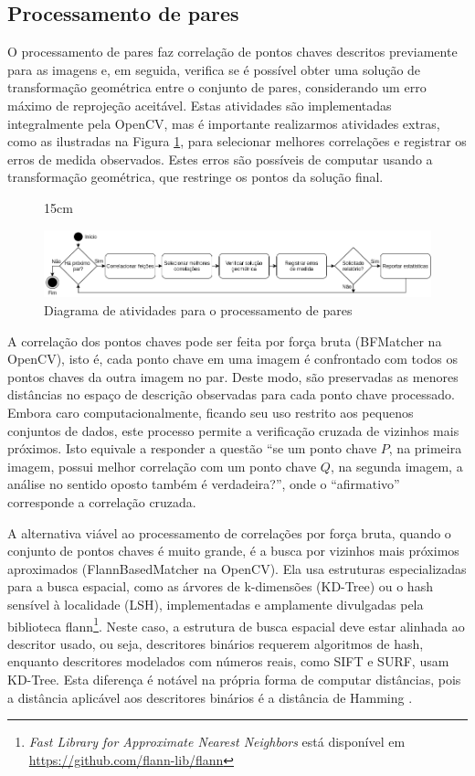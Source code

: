 \subsection{Processamento de pares}

O processamento de pares faz correlação de pontos chaves descritos previamente para as imagens e, em seguida, verifica se é possível obter uma solução de transformação geométrica entre o conjunto de pares, considerando um erro máximo de reprojeção aceitável. Estas atividades são implementadas integralmente pela OpenCV, mas é importante realizarmos atividades extras, como as ilustradas na Figura \ref{fl:pares}, para selecionar melhores correlações e registrar os erros de medida observados. Estes erros são possíveis de computar usando a transformação geométrica, que restringe os pontos da solução final.

\begin{figure}[!h]{15cm}
  \caption{Diagrama de atividades para o processamento de pares} \label{fl:pares}
  \includegraphics[width=\hsize]{figuras/fluxo_pares.png}
\end{figure}

A correlação dos pontos chaves pode ser feita por força bruta (BFMatcher na OpenCV), isto é, cada ponto chave em uma imagem é confrontado com todos os pontos chaves da outra imagem no par. Deste modo, são preservadas as menores distâncias no espaço de descrição observadas para cada ponto chave processado. Embora caro computacionalmente, ficando seu uso restrito aos pequenos conjuntos de dados, este processo permite a verificação cruzada de vizinhos mais próximos. Isto equivale a responder a questão ``se um ponto chave $P$, na primeira imagem, possui melhor correlação com um ponto chave $Q$, na segunda imagem, a análise no sentido oposto também é verdadeira?'', onde o ``afirmativo'' corresponde a correlação cruzada.

A alternativa viável ao processamento de correlações por força bruta, quando o conjunto de pontos chaves é muito grande, é a busca por vizinhos mais próximos aproximados (FlannBasedMatcher na OpenCV). Ela usa estruturas especializadas para a busca espacial, como as árvores de k-dimensões (KD-Tree) ou o hash sensível à localidade (LSH), implementadas e amplamente divulgadas pela biblioteca flann\footnote{\textit{Fast Library for Approximate Nearest Neighbors} está disponível em \url{https://github.com/flann-lib/flann}}. Neste caso, a estrutura de busca espacial deve estar alinhada ao descritor usado, ou seja, descritores binários requerem algoritmos de hash, enquanto descritores modelados com números reais, como SIFT e SURF, usam KD-Tree. Esta diferença é notável na própria forma de computar distâncias, pois a distância aplicável aos descritores binários é a distância de Hamming \cite{ORB}.

